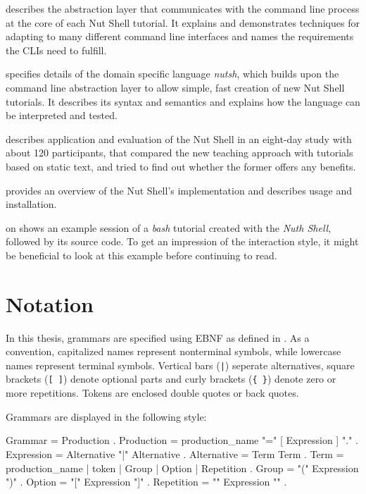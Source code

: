 \documentclass[paper=a4,twoside,abstract=on,cleardoublepage=empty,numbers=noenddot,toc=bib,12pt,appendixprefix=true]{scrreprt}
\begin{document}
 describes the abstraction layer that communicates with the command line process at the core of each Nut Shell tutorial. It explains and demonstrates techniques for adapting to many different command line interfaces and names the requirements the CLIs need to fulfill.

 specifies details of the domain specific language \emph{nutsh}, which builds upon the command line abstraction layer to allow simple, fast creation of new Nut Shell tutorials. It describes its syntax and semantics and explains how the language can be interpreted and tested.

 describes application and evaluation of the Nut Shell in an eight-day study with about 120 participants, that compared the new teaching approach with tutorials based on static text, and tried to find out whether the former offers any benefits.

 provides an overview of the Nut Shell's implementation and describes usage and installation.

 on  shows an example session of a \emph{bash} tutorial created with the \emph{Nuth Shell}, followed by its source code. To get an impression of the interaction style, it might be beneficial to look at this example before continuing to read.

\section{Notation}
\label{sec:ebnf}

In this thesis, grammars are specified using EBNF as defined in \cite{wirth77}. As a convention, capitalized names represent nonterminal symbols, while lowercase names represent terminal symbols. Vertical bars (\texttt{|}) seperate alternatives, square brackets (\texttt{[ ]}) denote optional parts and curly brackets (\texttt{\{ \}}) denote zero or more repetitions. Tokens are enclosed double quotes or back quotes.

Grammars are displayed in the following style:

\begin{ebnf}
Grammar     = { Production } .
Production  = production_name "=" [ Expression ] "." .
Expression  = Alternative { "|" Alternative } .
Alternative = Term { Term } .
Term        = production_name | token | Group | Option | Repetition .
Group       = "(" Expression ")" .
Option      = "[" Expression "]" .
Repetition  = "{" Expression "}" .
\end{ebnf}
\end{document}
